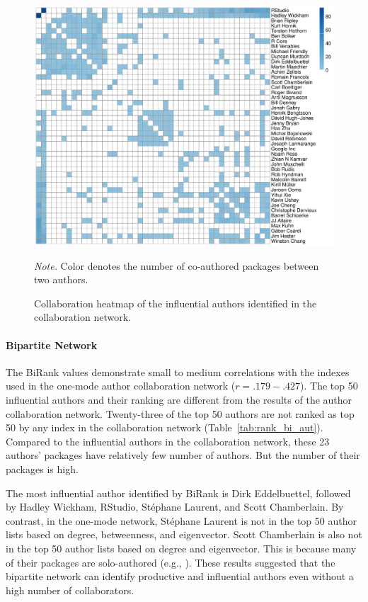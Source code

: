 \begin{figure}
\centering
    \includegraphics[width=15cm]{fig/cor_aut.pdf}
    \caption{Collaboration heatmap of the influential authors identified in the collaboration network.}

   {\small
\textit{Note.} Color denotes the number of co-authored packages between two authors.
}

    \label{fig:cor_aut}
\end{figure}



\paragraph{Bipartite Network} The BiRank values demonstrate small to medium correlations with the indexes used in the one-mode author collaboration network ($r=.179-.427$). The top 50 influential authors and their ranking are different from the results of the author collaboration network. Twenty-three of the top 50 authors are not ranked as top 50 by any index in the collaboration network (Table~\ref{tab:rank_bi_aut}). Compared to the influential authors in the collaboration network, these 23 authors' packages have relatively few number of authors. But the number of their packages is high. 

The most influential author identified by BiRank is Dirk Eddelbuettel, followed by Hadley Wickham, RStudio, Stéphane Laurent, and Scott Chamberlain. By contrast, in the one-mode network, Stéphane Laurent is not in the top 50 author lists based on degree, betweenness, and eigenvector. Scott Chamberlain is also not in the top 50 author lists based on degree and eigenvector. This is because many of their packages are solo-authored  (e.g., ). These results suggested that the bipartite network can identify productive and influential authors even without a high number of collaborators.



